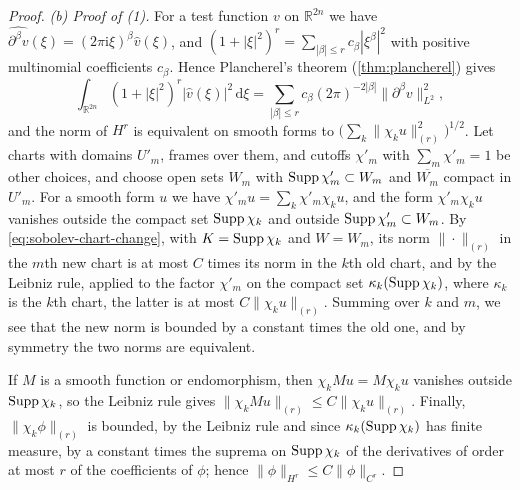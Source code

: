 \begin{proof}
\emph{(b) Proof of (1).} For a test function $v$ on $\mathbb R^{2n}$ we have $\widehat{\partial^\beta v}(\xi)=(2\pi\mathrm i\xi)^\beta\widehat v(\xi)$, and $(1+|\xi|^2)^r=\sum_{|\beta|\leq r}c_\beta|\xi^\beta|^2$ with positive multinomial coefficients $c_\beta$. Hence Plancherel's theorem (\cref{thm:plancherel}) gives
\begin{equation}\label{eq:sobolev-fourier-derivatives}
 \int_{\mathbb R^{2n}}(1+|\xi|^2)^r|\widehat v(\xi)|^2\,\mathrm d\xi=\sum_{|\beta|\leq r}c_\beta(2\pi)^{-2|\beta|}\|\partial^\beta v\|_{L^2}^2,
\end{equation}
and the norm of $H^r$ is equivalent on smooth forms to $\bigl(\sum_k\|\chi_ku\|_{(r)}^2\bigr)^{1/2}$. Let charts with domains $U'_m$, frames over them, and cutoffs $\chi'_m$ with $\sum_m\chi'_m=1$ be other choices, and choose open sets $W_m$ with $\operatorname{Supp}\chi'_m\subset W_m$ and $\overline{W_m}$ compact in $U'_m$. For a smooth form $u$ we have $\chi'_mu=\sum_k\chi'_m\chi_ku$, and the form $\chi'_m\chi_ku$ vanishes outside the compact set $\operatorname{Supp}\chi_k$ and outside $\operatorname{Supp}\chi'_m\subset W_m$. By \eqref{eq:sobolev-chart-change}, with $K=\operatorname{Supp}\chi_k$ and $W=W_m$, its norm $\|\cdot\|_{(r)}$ in the $m$th new chart is at most $C$ times its norm in the $k$th old chart, and by the Leibniz rule, applied to the factor $\chi'_m$ on the compact set $\kappa_k(\operatorname{Supp}\chi_k)$, where $\kappa_k$ is the $k$th chart, the latter is at most $C\|\chi_ku\|_{(r)}$. Summing over $k$ and $m$, we see that the new norm is bounded by a constant times the old one, and by symmetry the two norms are equivalent.

If $M$ is a smooth function or endomorphism, then $\chi_kMu=M\chi_ku$ vanishes outside $\operatorname{Supp}\chi_k$, so the Leibniz rule gives $\|\chi_kMu\|_{(r)}\leq C\|\chi_ku\|_{(r)}$. Finally, $\|\chi_k\phi\|_{(r)}$ is bounded, by the Leibniz rule and since $\kappa_k(\operatorname{Supp}\chi_k)$ has finite measure, by a constant times the suprema on $\operatorname{Supp}\chi_k$ of the derivatives of order at most $r$ of the coefficients of $\phi$; hence $\|\phi\|_{H^r}\leq C\|\phi\|_{C^r}$.


\end{proof}
